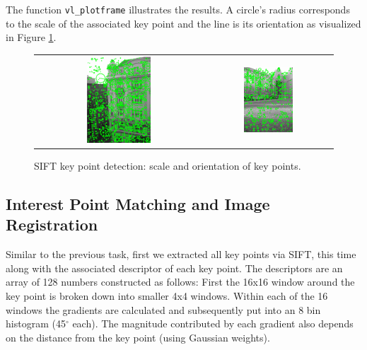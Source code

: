 The function \texttt{vl\_plotframe} illustrates the results. A circle's radius corresponds to the scale of the associated key point and the line is its orientation as visualized in Figure \ref{fig:a4:vlplotframe}.

\begin{figure}[h]
	\centering
	\begin{tabular}{cc}
	\includegraphics[width=0.4\textwidth]{figures/vl_plotframe_officeview1.png} &
	\includegraphics[width=0.4\textwidth]{figures/vl_plotframe_campus4.png} 

	\end{tabular}
	\caption{SIFT key point detection: scale and orientation of key points.}
	\label{fig:a4:vlplotframe}
\end{figure}

\subsection{Interest Point Matching and Image Registration}

Similar to the previous task, first we extracted all key points via SIFT, this time along with the associated descriptor of each key point. The descriptors are an array of 128 numbers constructed as follows: First the 16x16 window around the key point is broken down into smaller 4x4 windows. Within each of the 16 windows the gradients are calculated and subsequently put into an 8 bin histogram (45$^\circ$ each). The magnitude contributed by each gradient also depends on the distance from the key point (using Gaussian weights). 

